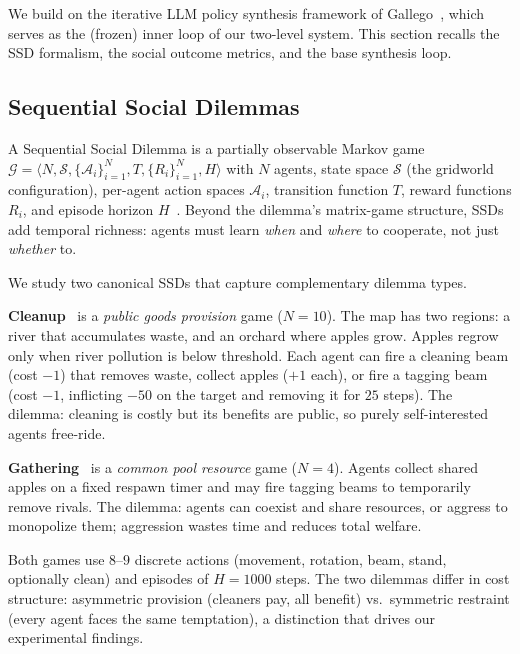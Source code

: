 \documentclass{article}
\newcommand{\cG}{\mathcal{G}}
\begin{document}
We build on the iterative LLM policy synthesis framework of Gallego~\cite{gallego2026}, which serves as the (frozen) inner loop of our two-level system. This section recalls the SSD formalism, the social outcome metrics, and the base synthesis loop.

\subsection{Sequential Social Dilemmas}

A Sequential Social Dilemma is a partially observable Markov game $\cG = \langle N, \mathcal{S}, \{\mathcal{A}_i\}_{i=1}^{N}, T, \{R_i\}_{i=1}^{N}, H \rangle$ with $N$ agents, state space $\mathcal{S}$ (the gridworld configuration), per-agent action spaces $\mathcal{A}_i$, transition function $T$, reward functions $R_i$, and episode horizon $H$~\cite{leibo2017}. Beyond the dilemma's matrix-game structure, SSDs add temporal richness: agents must learn \emph{when} and \emph{where} to cooperate, not just \emph{whether} to.

We study two canonical SSDs that capture complementary dilemma types.

\textbf{Cleanup}~\cite{hughes2018} is a \emph{public goods provision} game ($N{=}10$). The map has two regions: a river that accumulates waste, and an orchard where apples grow. Apples regrow only when river pollution is below threshold. Each agent can fire a cleaning beam (cost $-1$) that removes waste, collect apples ($+1$ each), or fire a tagging beam (cost $-1$, inflicting $-50$ on the target and removing it for $25$ steps). The dilemma: cleaning is costly but its benefits are public, so purely self-interested agents free-ride.

\textbf{Gathering}~\cite{leibo2017,perolat2017} is a \emph{common pool resource} game ($N{=}4$). Agents collect shared apples on a fixed respawn timer and may fire tagging beams to temporarily remove rivals. The dilemma: agents can coexist and share resources, or aggress to monopolize them; aggression wastes time and reduces total welfare.

Both games use $8$--$9$ discrete actions (movement, rotation, beam, stand, optionally clean) and episodes of $H{=}1000$ steps. The two dilemmas differ in cost structure: asymmetric provision (cleaners pay, all benefit) vs.\ symmetric restraint (every agent faces the same temptation), a distinction that drives our experimental findings.
\end{document}
